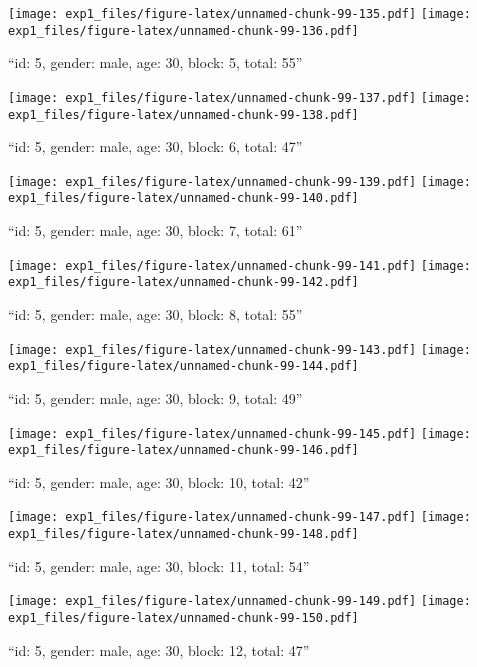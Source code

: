 \documentclass[,]{article}
\begin{document}
\texttt{[image: exp1\_files/figure-latex/unnamed-chunk-99-135.pdf]}
\texttt{[image: exp1\_files/figure-latex/unnamed-chunk-99-136.pdf]}

\newpage
[1] 

``id: 5, gender: male, age: 30, block: 5, total: 55''

\texttt{[image: exp1\_files/figure-latex/unnamed-chunk-99-137.pdf]}
\texttt{[image: exp1\_files/figure-latex/unnamed-chunk-99-138.pdf]}

\newpage
[1] 

``id: 5, gender: male, age: 30, block: 6, total: 47''

\texttt{[image: exp1\_files/figure-latex/unnamed-chunk-99-139.pdf]}
\texttt{[image: exp1\_files/figure-latex/unnamed-chunk-99-140.pdf]}

\newpage
[1] 

``id: 5, gender: male, age: 30, block: 7, total: 61''

\texttt{[image: exp1\_files/figure-latex/unnamed-chunk-99-141.pdf]}
\texttt{[image: exp1\_files/figure-latex/unnamed-chunk-99-142.pdf]}

\newpage
[1] 

``id: 5, gender: male, age: 30, block: 8, total: 55''

\texttt{[image: exp1\_files/figure-latex/unnamed-chunk-99-143.pdf]}
\texttt{[image: exp1\_files/figure-latex/unnamed-chunk-99-144.pdf]}

\newpage
[1] 

``id: 5, gender: male, age: 30, block: 9, total: 49''

\texttt{[image: exp1\_files/figure-latex/unnamed-chunk-99-145.pdf]}
\texttt{[image: exp1\_files/figure-latex/unnamed-chunk-99-146.pdf]}

\newpage
[1] 

``id: 5, gender: male, age: 30, block: 10, total: 42''

\texttt{[image: exp1\_files/figure-latex/unnamed-chunk-99-147.pdf]}
\texttt{[image: exp1\_files/figure-latex/unnamed-chunk-99-148.pdf]}

\newpage
[1] 

``id: 5, gender: male, age: 30, block: 11, total: 54''

\texttt{[image: exp1\_files/figure-latex/unnamed-chunk-99-149.pdf]}
\texttt{[image: exp1\_files/figure-latex/unnamed-chunk-99-150.pdf]}

\newpage
[1] 

``id: 5, gender: male, age: 30, block: 12, total: 47''
\end{document}
